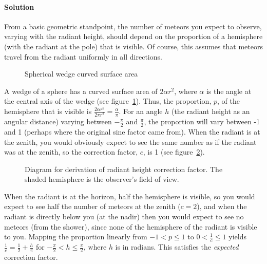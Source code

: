 \paragraph{Solution\\}
From a basic geometric standpoint, the number of meteors you expect to observe, varying with the radiant height, should depend on the proportion of a hemisphere (with the radiant at the pole) that is visible. Of course, this assumes that meteors travel from the radiant uniformly in all directions. 
\begin{figure}[h!]
	\centering
	
	\caption{Spherical wedge curved surface area \label{fig:wedge}}
\end{figure}
A wedge of a sphere has a curved surface area of $2{\alpha}r^2$, where $\alpha$ is the angle at the central axis of the wedge (see figure~\ref{fig:wedge}). Thus, the proportion, $p$, of the hemisphere that is visible is $\frac{2{\alpha}r^2}{2{\pi}r^2} = \frac{\alpha}{\pi}$. For an angle $h$ (the radiant height as an angular distance) varying between $-\frac{\pi}{2}$ and $\frac{\pi}{2}$, the proportion will vary between -1 and 1 (perhaps where the original sine factor came from). When the radiant is at the zenith, you would obviously expect to see the same number as if the radiant was at the zenith, so the correction factor, $c$, is 1 (see figure~\ref{fig:hemisphere}). 
\begin{figure}[h!]
	\centering
	
	\caption{Diagram for derivation of radiant height correction factor. The shaded hemisphere is the observer's field of view. \label{fig:hemisphere}}
\end{figure}
When the radiant is at the horizon, half the hemisphere is visible, so you would expect to see half the number of meteors at the zenith ($c = 2$), and when the radiant is directly below you (at the nadir) then you would expect to see no meteors (from the shower), since none of the hemisphere of the radiant is visible to you. Mapping the proportion linearly from $-1 < p \leq 1$ to $0 < \frac{1}{c} \leq 1$ yields $\frac{1}{c} = \frac{1}{2} + \frac{h}{\pi}$ for $-\frac{\pi}{2} < h \leq \frac{\pi}{2}$, where $h$ is in radians. This satisfies the \textit{expected} correction factor.

